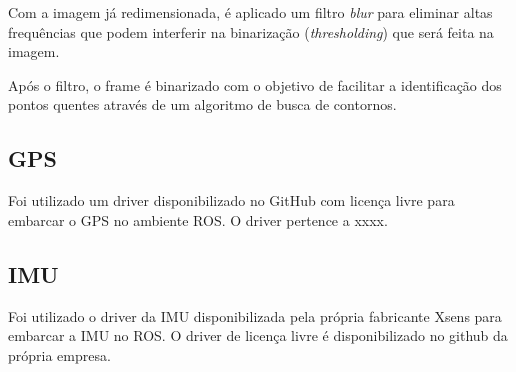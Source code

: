      Com a imagem já redimensionada, é aplicado um filtro \textit{blur} para eliminar altas frequências que podem interferir na binarização (\textit{thresholding}) que será feita na imagem.
     
     Após o filtro, o frame é binarizado com o objetivo de facilitar a identificação dos pontos quentes através de um algoritmo de busca de contornos.
     
     \subsection{GPS}
     
     Foi utilizado um driver disponibilizado no GitHub com licença livre para embarcar o GPS no ambiente ROS. O driver pertence a xxxx. 
     
     \subsection{IMU}
    Foi utilizado o driver da IMU disponibilizada pela própria fabricante Xsens para embarcar a IMU no ROS. O driver de licença livre é disponibilizado no github da própria empresa. 
    







